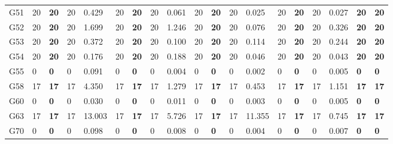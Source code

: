 \documentclass[12pt, a4paper]{article}%
\numberwithin{equation}{section}
\theoremstyle{plain}
\begin{document}
{\begin{landscape}
\begin{longtable}{lllllllllllllllllll}
						G51                       & 20   & \textbf{20}  & 20  & 0.429  & 20   & \textbf{20}  & 20  & 0.061 & 20   & \textbf{20}  & 20  & 0.025  & 20   & \textbf{20}  & 20  & 0.027 & \textbf{20}             & \textbf{20}          \\
						G52                       & 20   & \textbf{20}  & 20  & 1.699  & 20   & \textbf{20}  & 20  & 1.246 & 20   & \textbf{20}  & 20  & 0.076  & 20   & \textbf{20}  & 20  & 0.326 & \textbf{20}             & \textbf{20}          \\
						G53                       & 20   & \textbf{20}  & 20  & 0.372  & 20   & \textbf{20}  & 20  & 0.100 & 20   & \textbf{20}  & 20  & 0.114  & 20   & \textbf{20}  & 20  & 0.244 & \textbf{20}             & \textbf{20}          \\
						G54                       & 20   & \textbf{20}  & 20  & 0.176  & 20   & \textbf{20}  & 20  & 0.188 & 20   & \textbf{20}  & 20  & 0.046  & 20   & \textbf{20}  & 20  & 0.043 & \textbf{20}             & \textbf{20}          \\
						G55                       & 0    & \textbf{0}   & 0   & 0.091  & 0    & \textbf{0}   & 0   & 0.004 & 0    & \textbf{0}   & 0   & 0.002  & 0    & \textbf{0}   & 0   & 0.005 & \textbf{0}              & \textbf{0}           \\
						G58                       & 17   & \textbf{17}  & 17  & 4.350  & 17   & \textbf{17}  & 17  & 1.279 & 17   & \textbf{17}  & 17  & 0.453  & 17   & \textbf{17}  & 17  & 1.151 & \textbf{17}             & \textbf{17}          \\
						G60                       & 0    & \textbf{0}   & 0   & 0.030  & 0    & \textbf{0}   & 0   & 0.011 & 0    & \textbf{0}   & 0   & 0.003  & 0    & \textbf{0}   & 0   & 0.005 & \textbf{0}              & \textbf{0}           \\
						G63                       & 17   & \textbf{17}  & 17  & 13.003 & 17   & \textbf{17}  & 17  & 5.726 & 17   & \textbf{17}  & 17  & 11.355 & 17   & \textbf{17}  & 17  & 0.745 & \textbf{17}             & \textbf{17}          \\
						G70                       & 0    & \textbf{0}   & 0   & 0.098  & 0    & \textbf{0}   & 0   & 0.008 & 0    & \textbf{0}   & 0   & 0.004  & 0    & \textbf{0}   & 0   & 0.007 & \textbf{0}              & \textbf{0}           \\ \hline
					\end{longtable}
				\end{landscape}
			}
			
\end{document}
